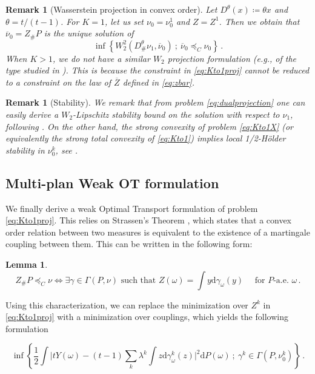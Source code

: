 \documentclass[12pt]{amsart}
\numberwithin{equation}{section}
\def\ed{\mathrm{d}}
\theoremstyle{plain}
\newtheorem{remark}[theorem]{Remark}
\newtheorem{lemma}[theorem]{Lemma}
\theoremstyle{definition}
\begin{document}
\begin{remark}[Wasserstein projection in convex order] Let $D^\theta(x) \coloneqq  \theta x$ and $\theta = t/(t-1)$. For 
$K=1$, let us set $\nu_0 = \nu_0^1$ and $Z = Z^1$. Then we obtain that $\overline{\nu}_0 = Z_\# P$ is the unique solution of
\[
\inf \left\{ W^2_2 (D^\theta_\# \nu_1, \overline{\nu}_0) ~;~  \overline{\nu}_0 \preceq_C \nu_0 \right\}\,.
\]
When $K>1$, we do not have a similar $W_2$ projection formulation (e.g., of the type studied in \cite{bolbotowski2025bi}). This is because the constraint in \eqref{eq:Kto1proj} cannot be reduced to a constraint on the law of $\overline{Z}$ defined in \eqref{eq:zbar}.
\end{remark}

\begin{remark}[Stability]  We remark that from problem \eqref{eq:dualprojection} one can easily derive a $W_2$-Lipschitz stability bound on the solution with respect to $\nu_1$, following \cite{kim2026stability,alfonsi2026wasserstein,di2026stability}. On the other hand, the strong convexity of problem \eqref{eq:Kto1X} (or equivalently the strong total convexity of \eqref{eq:Kto1}) implies local 1/2-Hölder stability in $\nu_0^k$, see \cite{gallouet2025metric,di2026stability}.
\end{remark}

\subsection{Multi-plan Weak OT formulation} We finally derive a weak Optimal Transport formulation of problem \eqref{eq:Kto1proj}. This relies on Strassen's Theorem \cite{strassen1965existence}, which states that a convex order relation between two measures is equivalent to the existence of a martingale coupling between them. This can be written in the following form:
\begin{lemma}\label{lem:strassen}
\[
Z_\# P \preceq_C \nu \iff \exists \gamma \in \Gamma(P,\nu) \text{ such that } Z(\omega) = \int y \ed \gamma_\omega(y) \quad \text{ for $P$-a.e. $\omega$} \,.
\]
\end{lemma}

Using this characterization, we can replace the minimization over $Z^k$ in \eqref{eq:Kto1proj} with a minimization over couplings, which yields the following formulation

\[
\inf \left\{ \frac{1}{2} \int \Big | t Y(\omega) - (t-1) \sum_k \lambda^k \int z \ed \gamma_\omega^k (z)\Big |^2 \ed P(\omega) ~ ; ~ \gamma^k \in \Gamma(P,\nu_0^k)  \right\}\,.
\]
\end{document}
